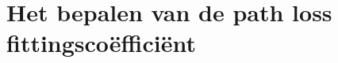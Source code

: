 \section{Het bepalen van de path loss fittingscoëfficiënt}
\label{ap:determineFittingsCoef}


\newpage
    
    \newpage
    
    \newpage
    
    \newpage
    
    \newpage
    














